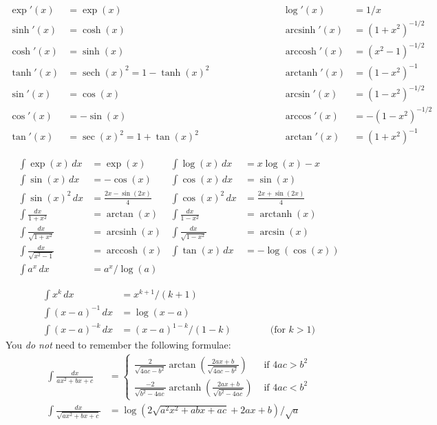\documentclass{amsart}
\newcommand{\sech}{\operatorname{sech}}
\newcommand{\arcsinh}{\operatorname{arcsinh}}
\newcommand{\arccosh}{\operatorname{arccosh}}
\newcommand{\arctanh}{\operatorname{arctanh}}
\renewcommand{\:}{\colon}
\begin{document}
\[ \begin{array}{rlcrl}
 \exp'(x)     &= \exp(x) &\hspace{6em}&
 \log'(x)     &= 1/x \\
 \sinh'(x)    &= \cosh(x) &&
 \arcsinh'(x) &= (1+x^2)^{-1/2} \\
 \cosh'(x)    &= \sinh(x) &&
 \arccosh'(x) &= (x^2-1)^{-1/2} \\
 \tanh'(x)    &= \sech(x)^2 = 1 - \tanh(x)^2 &&
 \arctanh'(x) &= (1-x^2)^{-1} \\
 \sin'(x)     &= \cos(x) &&
 \arcsin'(x)  &= (1-x^2)^{-1/2} \\
 \cos'(x)     &= -\sin(x) &&
 \arccos'(x)  &= -(1-x^2)^{-1/2} \\
 \tan'(x)     &= \sec(x)^2 = 1 + \tan(x)^2 &&
 \arctan'(x)  &= (1+x^2)^{-1}
\end{array} \]

\begin{align*}
 \int \exp(x)\,dx  &= \exp(x) &
 \int \log(x)\,dx  &= x\log(x) - x \\
 \int \sin(x)\, dx &= -\cos(x) &
 \int \cos(x)\, dx &= \sin(x) \\
 \int \sin(x)^2\, dx &= \frac{2x-\sin(2x)}{4} &
 \int \cos(x)^2\, dx &= \frac{2x+\sin(2x)}{4} \\
 \int \frac{dx}{1+x^2} &= \arctan(x) &
 \int \frac{dx}{1-x^2} &= \arctanh(x) \\
 \int \frac{dx}{\sqrt{1+x^2}} &= \arcsinh(x) &
 \int \frac{dx}{\sqrt{1-x^2}} &= \arcsin(x) \\
 \int \frac{dx}{\sqrt{x^2-1}} &= \arccosh(x) &
 \int \tan(x)\, dx &= -\log(\cos(x)) \\
 \int a^x\, dx     &= a^x/\log(a) 
\end{align*}

\begin{align*}
 \int x^k\,dx &= x^{k+1}/(k+1) \\
 \int (x-a)^{-1}\, dx &= \log(x-a) \\
 \int (x-a)^{-k}\, dx &= (x-a)^{1-k}/(1-k) 
   \hspace{4em} \text{(for $k>1$)} 
\end{align*}
\vspace{3ex}
You \emph{do not} need to remember the following formulae:
\begin{align*}
 \int \frac{dx}{ax^2+bx+c} &= 
  \begin{cases} \frac{2}{\sqrt{4ac-b^2}}
                \arctan\left(\frac{2ax+b}{\sqrt{4ac-b^2}}\right) &
                 \text{ if } 4ac > b^2 \\
                \frac{-2}{\sqrt{b^2-4ac}}
                \arctanh\left(\frac{2ax+b}{\sqrt{b^2-4ac}}\right) &
                 \text{ if } 4ac < b^2
  \end{cases} \\
 \int \frac{dx}{\sqrt{ax^2+bx+c}} &=
  \log(2\sqrt{a^2x^2+abx+ac}+2ax+b)/\sqrt{a} \\
\end{align*}
\end{document}
